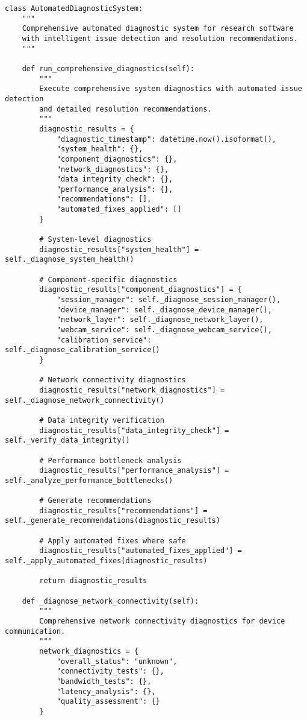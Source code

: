 \documentclass[12pt,a4paper]{article}
\begin{document}
\begin{verbatim}
class AutomatedDiagnosticSystem:
    """
    Comprehensive automated diagnostic system for research software
    with intelligent issue detection and resolution recommendations.
    """

    def run_comprehensive_diagnostics(self):
        """
        Execute comprehensive system diagnostics with automated issue detection
        and detailed resolution recommendations.
        """
        diagnostic_results = {
            "diagnostic_timestamp": datetime.now().isoformat(),
            "system_health": {},
            "component_diagnostics": {},
            "network_diagnostics": {},
            "data_integrity_check": {},
            "performance_analysis": {},
            "recommendations": [],
            "automated_fixes_applied": []
        }

        # System-level diagnostics
        diagnostic_results["system_health"] = self._diagnose_system_health()

        # Component-specific diagnostics
        diagnostic_results["component_diagnostics"] = {
            "session_manager": self._diagnose_session_manager(),
            "device_manager": self._diagnose_device_manager(),
            "network_layer": self._diagnose_network_layer(),
            "webcam_service": self._diagnose_webcam_service(),
            "calibration_service": self._diagnose_calibration_service()
        }

        # Network connectivity diagnostics
        diagnostic_results["network_diagnostics"] = self._diagnose_network_connectivity()

        # Data integrity verification
        diagnostic_results["data_integrity_check"] = self._verify_data_integrity()

        # Performance bottleneck analysis
        diagnostic_results["performance_analysis"] = self._analyze_performance_bottlenecks()

        # Generate recommendations
        diagnostic_results["recommendations"] = self._generate_recommendations(diagnostic_results)

        # Apply automated fixes where safe
        diagnostic_results["automated_fixes_applied"] = self._apply_automated_fixes(diagnostic_results)

        return diagnostic_results

    def _diagnose_network_connectivity(self):
        """
        Comprehensive network connectivity diagnostics for device communication.
        """
        network_diagnostics = {
            "overall_status": "unknown",
            "connectivity_tests": {},
            "bandwidth_tests": {},
            "latency_analysis": {},
            "quality_assessment": {}
        }


\end{verbatim}
\end{document}
